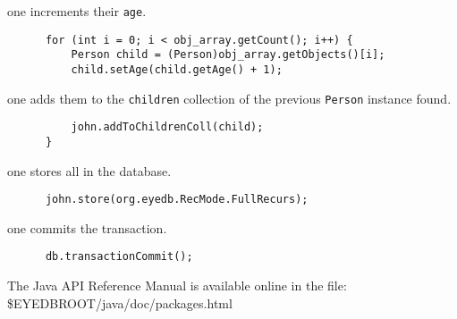 \item one increments their \texttt{age}.
{\verbsize \begin{verbatim}
      for (int i = 0; i < obj_array.getCount(); i++) {
          Person child = (Person)obj_array.getObjects()[i];
          child.setAge(child.getAge() + 1);
\end{verbatim}
}
\item one adds them to the \texttt{children} collection of the previous
\texttt{Person} instance found.
{\verbsize \begin{verbatim}
          john.addToChildrenColl(child);
      }
\end{verbatim}
}
\item one stores all in the database.
{\verbsize \begin{verbatim}
      john.store(org.eyedb.RecMode.FullRecurs);
\end{verbatim}
}
\item one commits the transaction.
{\verbsize \begin{verbatim}
      db.transactionCommit();
\end{verbatim}
}
\ei


The \eyedb Java API Reference Manual is available online in the file:
\\
\$EYEDBROOT/java/doc/packages.html


